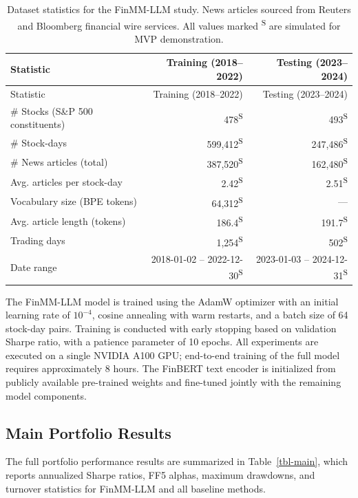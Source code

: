 \documentclass[
  11pt,
  a4paper,
]{article}
\begin{document}
\begin{longtable}[]{@{}lrr@{}}
\caption{Dataset statistics for the FinMM-LLM study. News articles
sourced from Reuters and Bloomberg financial wire services. All values
marked \textsuperscript{S} are simulated for MVP
demonstration.}\label{tbl-dataset}\tabularnewline
\toprule\noalign{}
Statistic & Training (2018--2022) & Testing (2023--2024) \\
\midrule\noalign{}
\endfirsthead
\toprule\noalign{}
Statistic & Training (2018--2022) & Testing (2023--2024) \\
\midrule\noalign{}
\endhead
\bottomrule\noalign{}
\endlastfoot
\# Stocks (S\&P 500 constituents) & 478\textsuperscript{S} &
493\textsuperscript{S} \\
\# Stock-days & 599,412\textsuperscript{S} &
247,486\textsuperscript{S} \\
\# News articles (total) & 387,520\textsuperscript{S} &
162,480\textsuperscript{S} \\
Avg. articles per stock-day & 2.42\textsuperscript{S} &
2.51\textsuperscript{S} \\
Vocabulary size (BPE tokens) & 64,312\textsuperscript{S} & --- \\
Avg. article length (tokens) & 186.4\textsuperscript{S} &
191.7\textsuperscript{S} \\
Trading days & 1,254\textsuperscript{S} & 502\textsuperscript{S} \\
Date range & 2018-01-02 -- 2022-12-30\textsuperscript{S} & 2023-01-03 --
2024-12-31\textsuperscript{S} \\
\end{longtable}

The FinMM-LLM model is trained using the AdamW optimizer with an initial
learning rate of \(10^{-4}\), cosine annealing with warm restarts, and a
batch size of 64 stock-day pairs. Training is conducted with early
stopping based on validation Sharpe ratio, with a patience parameter of
10 epochs. All experiments are executed on a single NVIDIA A100 GPU;
end-to-end training of the full model requires approximately 8 hours.
The FinBERT text encoder is initialized from publicly available
pre-trained weights and fine-tuned jointly with the remaining model
components.

\subsection{Main Portfolio Results}\label{main-portfolio-results}

The full portfolio performance results are summarized in
Table~\ref{tbl-main}, which reports annualized Sharpe ratios, FF5
alphas, maximum drawdowns, and turnover statistics for FinMM-LLM and all
baseline methods.
\end{document}

